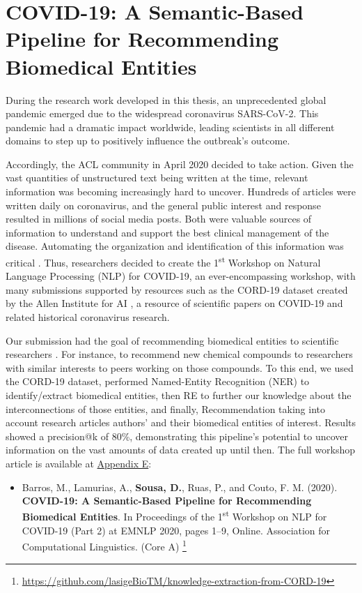 \section{COVID-19: A Semantic-Based Pipeline for Recommending Biomedical Entities}

During the research work developed in this thesis, an unprecedented global pandemic emerged due to the widespread coronavirus SARS-CoV-2. This pandemic had a dramatic impact worldwide, leading scientists in all different domains to step up to positively influence the outbreak's outcome.   

Accordingly, the \ac{ACL} community in April 2020 decided to take action. Given the vast quantities of unstructured text being written at the time, relevant information was becoming increasingly hard to uncover. Hundreds of articles were written daily on coronavirus, and the general public interest and response resulted in millions of social media posts. Both were valuable sources of information to understand and support the best clinical management of the disease. Automating the organization and identification of this information was critical \citep{nlp-covid19-2020-nlp}. Thus, researchers decided to create the 1\textsuperscript{st} Workshop on Natural Language Processing (NLP) for COVID-19, an ever-encompassing workshop, with many submissions supported by resources such as the CORD-19 dataset created by the Allen Institute for \acl{AI} \citep{wang-etal-2020-cord}, a resource of scientific papers on COVID-19 and related historical coronavirus research.

Our submission had the goal of recommending biomedical entities to scientific researchers  \citep{barros2020covid}. For instance, to recommend new chemical compounds to researchers with similar interests to peers working on those compounds. To this end, we used the CORD-19 dataset, performed Named-Entity Recognition (NER) to identify/extract biomedical entities, then RE to further our knowledge about the interconnections of those entities, and finally, Recommendation taking into account research articles authors' and their biomedical entities of interest. Results showed a precision@k of 80\%, demonstrating this pipeline's potential to uncover information on the vast amounts of data created up until then. The full workshop article is available at \hyperlink{AE}{Appendix E}:

\begin{itemize}[label=]
    \item{Barros, M., Lamurias, A., \textbf{Sousa, D.}, Ruas, P., and Couto, F. M. (2020). \textbf{COVID-19: A Semantic-Based Pipeline for Recommending Biomedical Entities}. In Proceedings of the 1\textsuperscript{st} Workshop on NLP for COVID-19 (Part 2) at EMNLP 2020, pages 1–9, Online. Association for Computational Linguistics. (Core A) \citep{barros2020covid}} \footnote{\url{https://github.com/lasigeBioTM/knowledge-extraction-from-CORD-19}}
\end{itemize}

